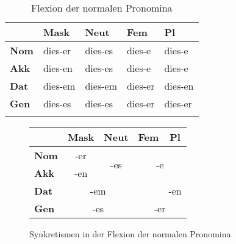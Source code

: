 \begin{table}[!htbp]
  \centering
  \begin{tabular}{lllll}
    \lsptoprule
    \multicolumn{1}{c}{} & \textbf{Mask} & \textbf{Neut} & \textbf{Fem} & \textbf{Pl} \\
    \midrule
    \textbf{Nom} & dies-er & dies-es & dies-e & dies-e \\
    \textbf{Akk} & dies-en & dies-es & dies-e & dies-e \\
    \textbf{Dat} & dies-em & dies-em & dies-er & dies-en \\
    \textbf{Gen} & dies-es & dies-es & dies-er & dies-er \\
    \lspbottomrule
  \end{tabular}
  \caption{Flexion der normalen Pronomina}
  \label{tab:pronflex}
\end{table}

\begin{figure}[!htbp]
  \centering
  \begin{tabular}{|l|c|c|c|c|}
    \cline{2-5}
    \multicolumn{1}{c|}{} & \textbf{Mask} & \textbf{Neut} & \textbf{Fem} & \textbf{Pl} \\
    \hline
    \textbf{Nom} & -er & \multirow{2}{*}{-es} & \multicolumn{2}{c|}{\multirow{2}{*}{-e}} \\ \cline{1-2}
    \textbf{Akk} & -en && \multicolumn{2}{c|}{} \\ \hline
    \textbf{Dat} & \multicolumn{2}{c|}{-em} && -en \\ \cline{1-3} \cline{5-5}
    \textbf{Gen} & \multicolumn{2}{c|}{-es} & \multicolumn{2}{c|}{-er} \\
    \hline
  \end{tabular}
  \caption{Synkretismen in der Flexion der normalen Pronomina}
  \label{fig:pronflexsynk}
\end{figure}

